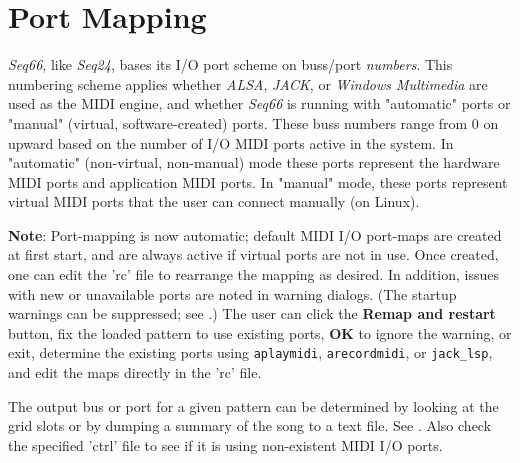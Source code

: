 %
%
%

\section{Port Mapping}
\label{sec:port_mapping}

   \textsl{Seq66}, like \textsl{Seq24}, bases its I/O port scheme on buss/port
   \textsl{numbers}.
   This numbering scheme applies whether
   \textsl{ALSA}, \textsl{JACK}, or \textsl{Windows Multimedia}
   are used as the MIDI engine, and whether \textsl{Seq66} is running with
   "automatic" ports or "manual" (virtual, software-created) ports.
   These buss numbers range from 0 on upward
   based on the number of I/O MIDI ports active in the system.
   In "automatic" (non-virtual, non-manual) mode
   these ports represent the hardware MIDI ports and application MIDI ports.
   In "manual" mode, these ports represent virtual MIDI ports that the user
   can connect manually (on Linux).

   \textbf{Note}:
   Port-mapping is now automatic; default MIDI I/O port-maps are
   created at first start, and are always active if virtual ports are not in
   use.  Once created, one can edit the 'rc' file to rearrange the mapping as
   desired.
   In addition, issues with new or unavailable ports are
   noted in warning dialogs.
   (The startup warnings can be suppressed;
   see .)
   The user can click the \textbf{Remap and restart} button,
   fix the loaded pattern to use existing ports, \textbf{OK} to ignore
   the warning,
   or exit, determine the existing ports using
   \texttt{aplaymidi}, \texttt{arecordmidi}, or \texttt{jack\_lsp},
   and edit the maps directly in the 'rc' file.

   The output bus or port for a given pattern can be determined by
   looking at the grid slots or by dumping a summary of the song to
   a text file.
   See .
   Also check the specified 'ctrl' file to see if it is using
   non-existent MIDI I/O ports.

